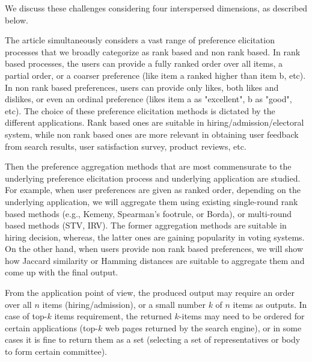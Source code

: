 \documentclass[11pt]{article}
\begin{document}
\smallskip \noindent We discuss these challenges considering four interspersed dimensions, as described below.

\smallskip {}
The article simultaneously considers a vast range of preference elicitation processes that we broadly categorize as rank based and non rank based. In rank based processes, the users can provide a fully ranked order over all items, a partial order, or a coarser preference (like item a ranked higher than item b, etc). In non rank based preferences, users can provide only likes, both likes and dislikes, or even an ordinal preference (likes item a as "excellent", b as "good", etc). The choice of these preference elicitation methods is dictated by the different applications. Rank based ones are suitable in hiring/admission/electoral system, while non rank based ones are more relevant in obtaining user feedback from search results, user satisfaction survey, product reviews, etc.

\smallskip {}
Then the preference aggregation methods that are most commensurate to the underlying preference elicitation process and underlying application are studied. For example, when user preferences are given as ranked order, depending on the underlying application, we will aggregate them using existing single-round rank based methods  (e.g., Kemeny, Spearman's footrule, or Borda), or multi-round based methods (STV, IRV). The former aggregation methods are suitable in hiring decision, whereas, the latter ones are gaining popularity in voting systems. On the other hand, when users provide non rank based preferences, we will show how Jaccard similarity or Hamming distances are suitable to aggregate them and come up with the final output. 

\smallskip {}
From the application point of view, the produced output may require an order over all $n$ items (hiring/admission), or a small number $k$ of $n$ items as outputs. In case of top-$k$ items requirement, the returned $k$-items may need to be ordered for certain applications  (top-$k$ web pages returned by the search engine), or in some cases it is fine to return them as a set (selecting a set of representatives or body to form certain committee). 
\end{document}
